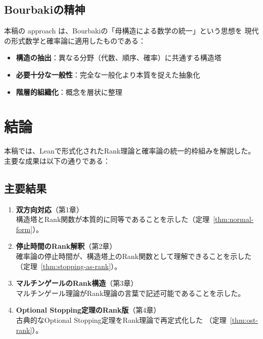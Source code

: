\documentclass[a4paper,12pt]{ltjsarticle}
\theoremstyle{definition}
\begin{document}
\subsection{Bourbakiの精神}

本稿の approach は、Bourbakiの「母構造による数学の統一」という思想を
現代の形式数学と確率論に適用したものである：

\begin{itemize}
  \item \textbf{構造の抽出}：異なる分野（代数、順序、確率）に共通する構造塔
  \item \textbf{必要十分な一般性}：完全な一般化より本質を捉えた抽象化
  \item \textbf{階層的組織化}：概念を層状に整理
\end{itemize}

\section{結論}

本稿では、Leanで形式化されたRank理論と確率論の統一的枠組みを解説した。
主要な成果は以下の通りである：

\subsection{主要結果}

\begin{enumerate}
  \item \textbf{双方向対応}（第1章）\\
    構造塔とRank関数が本質的に同等であることを示した（定理~\ref{thm:normal-form}）。

  \item \textbf{停止時間のRank解釈}（第2章）\\
    確率論の停止時間が、構造塔上のRank関数として理解できることを示した
    （定理~\ref{thm:stopping-as-rank}）。

  \item \textbf{マルチンゲールのRank構造}（第3章）\\
    マルチンゲール理論がRank理論の言葉で記述可能であることを示した。

  \item \textbf{Optional Stopping定理のRank版}（第4章）\\
    古典的なOptional Stopping定理をRank理論で再定式化した
    （定理~\ref{thm:ost-rank}）。
\end{enumerate}
\end{document}

